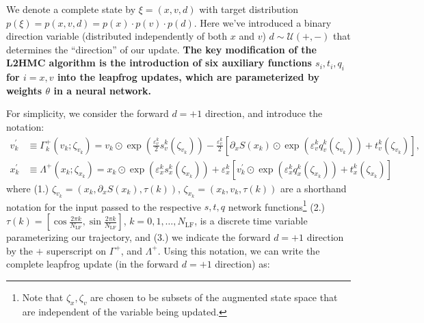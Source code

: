 \documentclass{article} %
\begin{document}
We denote a complete state by \(\xi = (x, v, d)\) with target distribution \(p(\xi) = p(x, v, d) = p(x)\cdot p(v)\cdot
p(d)\).
%
Here we've introduced a binary direction variable (distributed independently of both \(x\) and \(v\))
\(d\sim\mathcal{U}(+,-)\) that determines the ``direction'' of our update.
%
\textbf{The key modification of the L2HMC algorithm is the introduction of six auxiliary functions \(s_{i}, t_{i}, q_{i}\) for \(i
= x, v\) into the leapfrog updates, which are parameterized by weights \(\theta\) in a neural network.}
%
%

For simplicity, we consider the forward \(d=+1\) direction, and introduce the notation:
%
\begin{align}
   v^{\prime}_{k} &\equiv \Gamma^{+}_{k}(v_{k};\zeta_{v_{k}})
   = v_{k}\odot \exp{\left(\tfrac{\varepsilon^{k}_{v}}{2}s_{v}^{k}(\zeta_{v_{k}})\right)} -
   \tfrac{\varepsilon^{k}_{v}}{2}{\left[\partial_{x}S(x_{k})\odot\exp{\left(\varepsilon^{k}_{v} q_{v}^{k}(\zeta_{v_{k}})\right)}
      +t_{v}^{k}(\zeta_{v_{k}})\right]},\label{eq:new_momentum_update}\\
   x^{\prime}_{k} &\equiv \Lambda^{+}(x_{k};\zeta_{x_{k}})
   = x_{k}\odot\exp(\varepsilon^{k}_{x} s^{k}_{x}(\zeta_{x_{k}}))
   + \varepsilon^{k}_{x}\left[v^{\prime}_{k}\odot\exp(\varepsilon^{k}_{x} q^{k}_{x}(\zeta_{x_{k}}))
         + t^{k}_{x}(\zeta_{x_{k}})\right]\label{eq:new_position_update}
\end{align}
%
where (1.) \(\zeta_{v_{k}} = (x_{k}, \partial_{x}S(x_{k}), \tau(k))\), \(\zeta_{x_{k}} = (x_{k}, v_{k}, \tau(k))\) are a
shorthand notation for the input passed to the respective \(s, t, q\) network functions\footnote{Note that \(\zeta_{x},
\zeta_{v}\) are chosen to be subsets of the augmented state space that are independent of the variable being updated.}
(2.) \(\tau(k) = {\left[\cos\tfrac{2\pi k}{N_{\mathrm{LF}}}, \sin\tfrac{2\pi k}{N_{\mathrm{LF}}}\right]}\), \(k = 0, 1,
\ldots, N_{\mathrm{LF}}\), is a discrete time variable parameterizing our trajectory, and (3.) we indicate the forward
\(d=+1\) direction by the \(+\) superscript on \(\Gamma^{+}\), and \(\Lambda^{+}\).
%
Using this notation, we can write the complete leapfrog update (in the forward \(d=+1\) direction) as:
%
\end{document}
